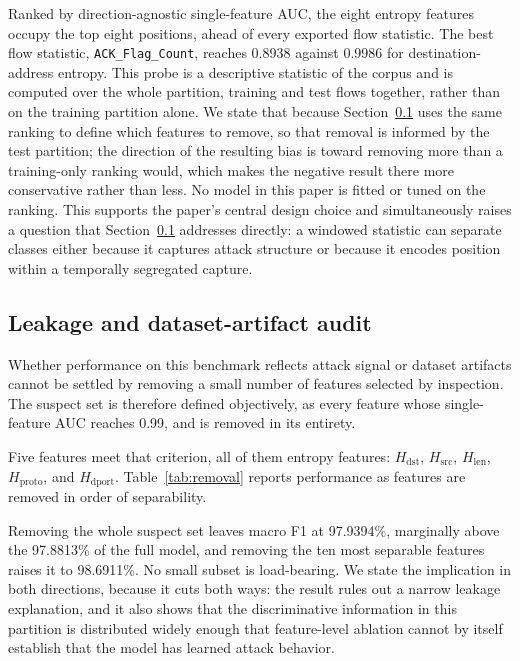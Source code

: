 \documentclass{ieeeaccess}
\begin{document}
Ranked by direction-agnostic single-feature AUC, the eight entropy features occupy the top eight positions, ahead of every exported flow statistic. The best flow statistic, \texttt{ACK\_Flag\_Count}, reaches 0.8938 against 0.9986 for destination-address entropy. This probe is a descriptive statistic of the corpus and is computed over the whole partition, training and test flows together, rather than on the training partition alone. We state that because Section~\ref{sec:leakage} uses the same ranking to define which features to remove, so that removal is informed by the test partition; the direction of the resulting bias is toward removing more than a training-only ranking would, which makes the negative result there more conservative rather than less. No model in this paper is fitted or tuned on the ranking. This supports the paper's central design choice and simultaneously raises a question that Section~\ref{sec:leakage} addresses directly: a windowed statistic can separate classes either because it captures attack structure or because it encodes position within a temporally segregated capture.

\subsection{Leakage and dataset-artifact audit}
\label{sec:leakage}
Whether performance on this benchmark reflects attack signal or dataset artifacts cannot be settled by removing a small number of features selected by inspection. The suspect set is therefore defined objectively, as every feature whose single-feature AUC reaches 0.99, and is removed in its entirety.

Five features meet that criterion, all of them entropy features: $H_{\mathrm{dst}}$, $H_{\mathrm{src}}$, $H_{\mathrm{len}}$, $H_{\mathrm{proto}}$, and $H_{\mathrm{dport}}$. Table~\ref{tab:removal} reports performance as features are removed in order of separability.

Removing the whole suspect set leaves macro F1 at 97.9394\%, marginally above the 97.8813\% of the full model, and removing the ten most separable features raises it to 98.6911\%. No small subset is load-bearing. We state the implication in both directions, because it cuts both ways: the result rules out a narrow leakage explanation, and it also shows that the discriminative information in this partition is distributed widely enough that feature-level ablation cannot by itself establish that the model has learned attack behavior.
\end{document}
